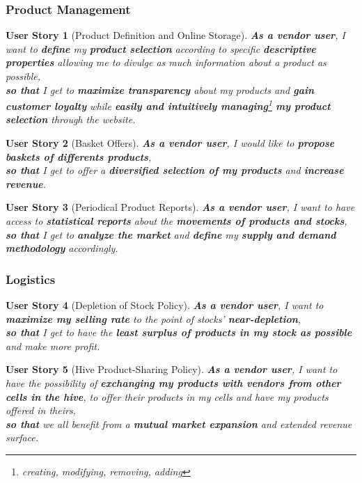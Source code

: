 \documentclass[a4paper,12pt]{book}
\theoremstyle{break}
\newtheorem{userStory}{User Story}
\theoremstyle{break}
\theoremstyle{break}
\theoremstyle{break}
\theoremstyle{definition}
\theoremstyle{remark}
\begin{document}
\subsubsection{Product Management}
\begin{userStory}[Product Definition and Online Storage]
\textbf{As a {\color{red} vendor} user}, I want to \textbf{define} my \textbf{product selection} according to specific \textbf{descriptive properties} allowing me to divulge as much information about a product as possible,\\
\indent
\textbf{so that} I get to \textbf{maximize transparency} about my products and \textbf{gain customer loyalty} while \textbf{easily and intuitively managing}\footnote{creating, modifying, removing, adding} \textbf{my product selection} through the website.
\end{userStory}

\begin{userStory}[Basket Offers]
\textbf{As a {\color{red} vendor} user}, I would like to \textbf{propose baskets of differents products},\\
\indent
\textbf{so that} I get to offer a \textbf{diversified selection of my products} and \textbf{increase revenue}.
\end{userStory}

\begin{userStory}[Periodical Product Reports]
\textbf{As a {\color{red} vendor} user}, I want to have access to \textbf{statistical reports} about the \textbf{movements of products and stocks},\\
\indent
\textbf{so that} I get to \textbf{analyze the market} and \textbf{define} my \textbf{supply and demand methodology} accordingly.
\end{userStory}

\subsubsection{Logistics}
\begin{userStory}[Depletion of Stock Policy]
\textbf{As a {\color{red} vendor} user}, I want to \textbf{maximize my selling rate} to the point of stocks' \textbf{near-depletion},\\
\indent
\textbf{so that} I get to have the \textbf{least surplus of products in my stock as possible} and make more profit.
\end{userStory}

\begin{userStory}[Hive Product-Sharing Policy]
\textbf{As a {\color{red} vendor} user}, I want to have the possibility of \textbf{exchanging my products with vendors from other cells in the hive}, to offer their products in my cells and have my products offered in theirs,\\
\indent
\textbf{so that} we all benefit from a \textbf{mutual market expansion} and extended revenue surface.
\end{userStory}
\end{document}

